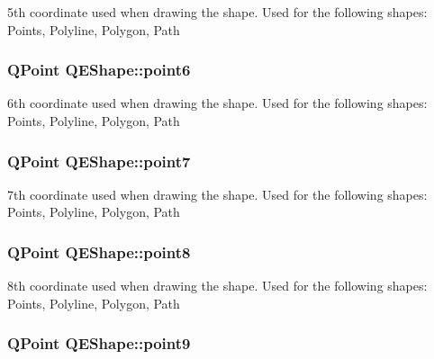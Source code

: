 \label{classQEShape_aa7eaf5fd15ec4d2e799a7f39bf4e9cef}
5th coordinate used when drawing the shape. Used for the following shapes: Points, Polyline, Polygon, Path \hypertarget{classQEShape_ab90ca6da2a435753d713b288f315c9d8}{
\subsubsection[{point6}]{\setlength{\rightskip}{0pt plus 5cm}QPoint QEShape::point6}}
\label{classQEShape_ab90ca6da2a435753d713b288f315c9d8}
6th coordinate used when drawing the shape. Used for the following shapes: Points, Polyline, Polygon, Path \hypertarget{classQEShape_ae6aa684a03e03e4bbf86727d05a7e258}{
\subsubsection[{point7}]{\setlength{\rightskip}{0pt plus 5cm}QPoint QEShape::point7}}
\label{classQEShape_ae6aa684a03e03e4bbf86727d05a7e258}
7th coordinate used when drawing the shape. Used for the following shapes: Points, Polyline, Polygon, Path \hypertarget{classQEShape_a04c9ab4f601d7edcfdb32937502227c1}{
\subsubsection[{point8}]{\setlength{\rightskip}{0pt plus 5cm}QPoint QEShape::point8}}
\label{classQEShape_a04c9ab4f601d7edcfdb32937502227c1}
8th coordinate used when drawing the shape. Used for the following shapes: Points, Polyline, Polygon, Path \hypertarget{classQEShape_af3718d1ab3026126417cf53eb500b556}{
\subsubsection[{point9}]{\setlength{\rightskip}{0pt plus 5cm}QPoint QEShape::point9}}
\label{classQEShape_af3718d1ab3026126417cf53eb500b556}
